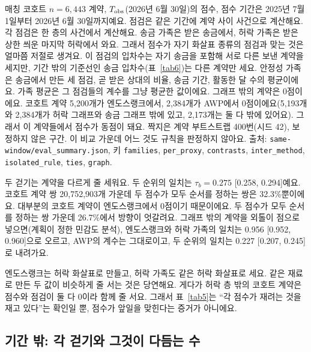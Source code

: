 \begin{table}[!htbp]
\begin{minipage}{\linewidth}\footnotesize\raggedright\vspace{0.4em}
매칭 코호트 $n=6{,}443$ 계약, $T_{\mathrm{obs}}$(2026년 6월 30일)의 점수, 점수 기간은 2025년 7월 1일부터 2026년 6월 30일까지예요. 점검은 같은 기간에 계약 사이 사건으로 계산해요. 각 점검은 한 층의 사건에서 계산해요. 송금 가족은 받은 송금에서, 허락 가족은 받은 상한 씌운 마지막 허락에서 와요. 그래서 점수가 자기 화살표 종류의 점검과 맞는 것은 얼마쯤 저절로 생겨요. 이 점검의 입차수는 자기 송금을 포함해 서로 다른 보낸 계약을 세지만, 기간 밖의 기준선인 송금 입차수(표~\ref{tab6})는 다른 계약만 세요. 안정성 가족은 송금에서 만든 세 점검, 곧 받은 상대의 비율, 송금 기간, 활동한 달 수의 평균이에요. 가족 평균은 그 점검들의 계수를 그냥 평균한 값이에요. 그래프 밖의 계약은 0점이에요. 코호트 계약 5,200개가 엔도스랭크에서, 2,384개가 AWP에서 0점이에요(5,193개와 2,384개가 허락 그래프와 송금 그래프 밖에 있고, 2,173개는 둘 다 밖에 있어요). 그래서 이 계약들에서 점수가 동점이 돼요. 짝지은 계약 부트스트랩 400번(시드 42), 보정하지 않은 구간. 이 비교 가운데 어느 것도 규칙을 판정하지 않아요. 출처: \texttt{same-window/eval\_summary.json}, 키 \texttt{families}, \texttt{per\_proxy}, \texttt{contrasts}, \texttt{inter\_method}, \texttt{isolated\_rule}, \texttt{ties}, \texttt{graph}.
\end{minipage}
\end{table}

두 걷기는 계약을 다르게 줄 세워요. 두 순위의 일치는 $\tau_b=0.275$ [0.258, 0.294]예요. 코호트 계약 쌍 20,752,903개 가운데 두 점수가 모두 순서를 정하는 쌍은 32.3\%뿐이에요. 대부분의 코호트 계약이 엔도스랭크에서 0점이기 때문이에요. 두 점수가 모두 순서를 정하는 쌍 가운데 26.7\%에서 방향이 엇갈려요. 그래프 밖의 계약을 외톨이 점으로 넣으면(계획이 정한 민감도 분석), 엔도스랭크와 허락 가족의 일치는 0.956 [0.952, 0.960]으로 오르고, AWP의 계수는 그대로이고, 두 순위의 일치는 0.227 [0.207, 0.245]로 내려가요.

\begin{puri}
엔도스랭크는 허락 화살표로 만들고, 허락 가족도 같은 허락 화살표로 세요. 같은 재료로 만든 두 값이 비슷하게 줄 서는 것은 당연해요. 게다가 허락 층 밖의 코호트 계약은 점수와 점검이 둘 다 0이라 함께 줄 서요. 그래서 표~\ref{tab5}는 “각 점수가 재려는 것을 재고 있다”는 확인일 뿐, 점수가 앞일을 맞힌다는 증거가 아니에요.
\end{puri}

\subsection{기간 밖: 각 걷기와 그것이 다듬는 수}
\label{sec:holdout}


